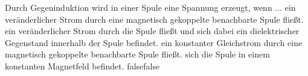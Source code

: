     {Durch Gegeninduktion wird in einer Spule eine Spannung erzeugt, wenn ...}
    {ein veränderlicher Strom durch eine magnetisch gekoppelte benachbarte Spule fließt.}
    {ein veränderlicher Strom durch die Spule fließt und sich dabei ein dielektrischer Gegenstand innerhalb der Spule befindet. }
    {ein konstanter Gleichstrom durch eine magnetisch gekoppelte benachbarte Spule fließt.}
    {sich die Spule in einem konstanten Magnetfeld befindet.}
    {false}{false}